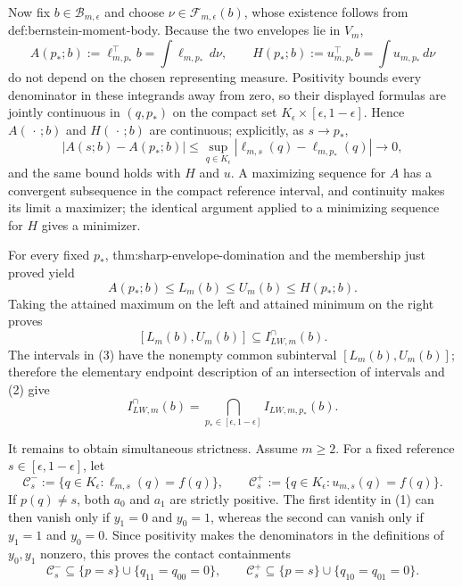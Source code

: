 Now fix \(b\in\mathcal B_{m,\epsilon}\) and choose
\(\nu\in\mathcal F_{m,\epsilon}(b)\), whose existence follows from
def:bernstein-moment-body. Because the two envelopes lie in \(V_m\),
\[
 A(p_*;b):=\ell_{m,p_*}^{\top}b=\int\ell_{m,p_*}\,d\nu,
 \qquad
 H(p_*;b):=u_{m,p_*}^{\top}b=\int u_{m,p_*}\,d\nu                     \tag{2}
\]
do not depend on the chosen representing measure. Positivity bounds every
denominator in these integrands away from zero, so their displayed formulas
are jointly continuous in \((q,p_*)\) on the compact set
\(K_{\epsilon}\times[\epsilon,1-\epsilon]\). Hence \(A(\,\cdot\,;b)\) and
\(H(\,\cdot\,;b)\) are continuous; explicitly, as \(s\to p_*\),
\[
 |A(s;b)-A(p_*;b)|
 \leq\sup_{q\in K_{\epsilon}}|\ell_{m,s}(q)-\ell_{m,p_*}(q)|
 \longrightarrow0,
\]
and the same bound holds with \(H\) and \(u\). A maximizing sequence for \(A\) has a
convergent subsequence in the compact reference interval, and continuity makes
its limit a maximizer; the identical argument applied to a minimizing sequence
for \(H\) gives a minimizer.

For every fixed \(p_*\), thm:sharp-envelope-domination and the membership just
proved yield
\[
 A(p_*;b)\leq L_m(b)\leq U_m(b)\leq H(p_*;b).                         \tag{3}
\]
Taking the attained maximum on the left and attained minimum on the right proves
\[
 [L_m(b),U_m(b)]\subseteq I_{LW,m}^{\cap}(b).
\]
The intervals in (3) have the nonempty common subinterval
\([L_m(b),U_m(b)]\); therefore the elementary endpoint description of an
intersection of intervals and (2) give
\[
 I_{LW,m}^{\cap}(b)=
 \bigcap_{p_*\in[\epsilon,1-\epsilon]}I_{LW,m,p_*}(b).                \tag{4}
\]

It remains to obtain simultaneous strictness. Assume \(m\geq2\). For a fixed
reference \(s\in[\epsilon,1-\epsilon]\), let
\[
 \mathcal C_s^-:=\{q\in K_{\epsilon}:\ell_{m,s}(q)=f(q)\},
 \qquad
 \mathcal C_s^+:=\{q\in K_{\epsilon}:u_{m,s}(q)=f(q)\}.
\]
If \(p(q)\neq s\), both \(a_0\) and \(a_1\) are strictly positive. The first
identity in (1) can then vanish only if \(y_1=0\) and \(y_0=1\), whereas the
second can vanish only if \(y_1=1\) and \(y_0=0\). Since positivity makes the
denominators in the definitions of \(y_0,y_1\) nonzero, this proves the contact
containments
\[
 \mathcal C_s^-\subseteq\{p=s\}\cup\{q_{11}=q_{00}=0\},
 \qquad
 \mathcal C_s^+\subseteq\{p=s\}\cup\{q_{10}=q_{01}=0\}.              \tag{5}
\]

